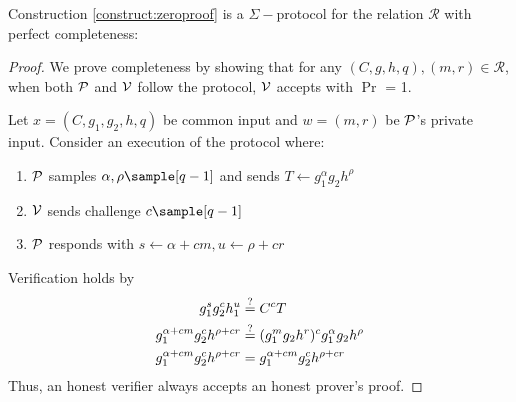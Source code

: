 \begin{theorem}
    Construction \ref{construct:zeroproof} is a $\Sigma-$protocol for the relation $\mathcal{R}$ with perfect completeness: 
\end{theorem}
\begin{proof}
    We prove completeness by showing that for any $(C, g, h, q),(m,r) \in \mathcal{R}$, when both $\mathcal{P}$ and $\mathcal{V}$ follow the protocol, $\mathcal{V}$ accepts with $\Pr$ = 1.

    Let $x = (C,g_1,g_2,h,q)$ be common input and $w = (m, r)$ be $\mathcal{P}$'s private input. Consider an execution of the protocol where:
    \begin{enumerate}
        \item $\mathcal{P}$ samples $\alpha, \rho \sample [q-1]$ and sends $T \gets g_1^{\alpha}g_2h^{\rho}$
        \item $\mathcal{V}$ sends challenge $c \sample [q-1]$
        \item $\mathcal{P}$ responds with $s \gets \alpha+cm, u \gets \rho+cr$
    \end{enumerate}
    Verification holds by 
    \begin{align}
        g_1^sg_2^ch_1^u &\stackrel{?}{=} C^cT \notag \\
        g_1^{\alpha + cm}g_2^ch^{\rho + cr} &\stackrel{?}{=} (g_1^{m}g_2h^r)^c g_1^{\alpha}g_2h^{\rho} \notag \\
        g_1^{\alpha + cm}g_2^ch^{\rho + cr} &= g_1^{\alpha + cm}g_2^c h^{\rho + cr} \notag \\
    \end{align}
    Thus, an honest verifier always accepts an honest prover's proof.
\end{proof}


